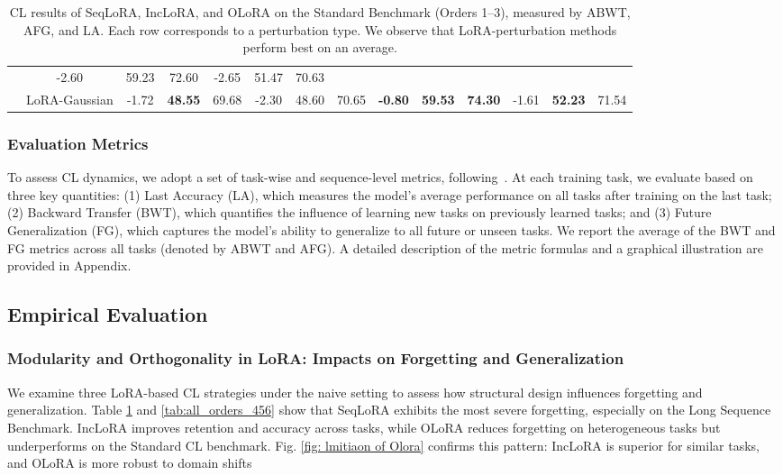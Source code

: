 \documentclass[letterpaper]{article} %
\begin{document}
\begin{table}[thbp]
{\begin{tabular}{cc|ccc|ccc|ccc|ccc}
                  & -2.60 & 59.23 & 72.60 
                  & -2.65 & 51.47 & 70.63 \\
& LoRA-Gaussian   & -1.72 & \textbf{48.55} & 69.68 
                  & -2.30 & 48.60 & 70.65 
                  & \textbf{-0.80} & \textbf{59.53} & \textbf{74.30} 
                  & -1.61 & \textbf{52.23} & 71.54 \\
\bottomrule
\end{tabular}
}
\caption{CL results of SeqLoRA, IncLoRA, and OLoRA on the Standard Benchmark (Orders 1–3), measured by ABWT, AFG, and LA. Each row corresponds to a perturbation type. We observe that LoRA-perturbation methods perform best on an average.}
\vspace{-10pt}
\label{tab:all_orders3}
\end{table}

\subsubsection{Evaluation Metrics}


To assess CL dynamics, we adopt a set of task-wise and sequence-level metrics, following~\cite{NIPS2017_f8752278,díazrodríguez2018dontforgetforgettingnew}. At each training task, we evaluate based on three key quantities: (1) {Last Accuracy (LA)}, which measures the model's average performance on all tasks after training on the last task; (2) {Backward Transfer (BWT)}, which quantifies the influence of learning new tasks on previously learned tasks; and (3) {Future Generalization (FG)}, which captures the model’s ability to generalize to all future or unseen tasks. We report the average of the BWT and FG metrics across all tasks (denoted by ABWT and AFG).
A detailed description of the metric formulas and a graphical illustration are provided in Appendix.


\subsection{Empirical Evaluation}


\subsubsection{Modularity and Orthogonality in LoRA: Impacts on Forgetting and Generalization}


We examine three LoRA-based CL strategies under the naive setting to assess how structural design influences forgetting and generalization. Table \ref{tab:all_orders3} and \ref{tab:all_orders_456} show that SeqLoRA exhibits the most severe forgetting, especially on the Long Sequence Benchmark. IncLoRA improves retention and accuracy across tasks, while OLoRA reduces forgetting on heterogeneous tasks but underperforms on the Standard CL benchmark. Fig. \ref{fig: lmitiaon of Olora} confirms this pattern: IncLoRA is superior for similar tasks, and OLoRA is more robust to domain shifts
\end{document}
